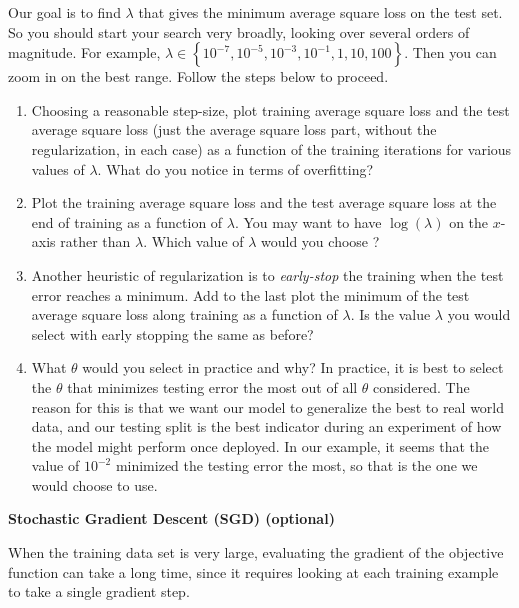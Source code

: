 \documentclass{article}
\newcommand{\nyuparagrah}[1]{\textcolor{nyupurple}{\large #1}}
\begin{document}
Our goal is to find $\lambda$
that gives the minimum average square loss on the test set. So you should start your search very broadly, looking
over several orders of magnitude. For example, $\lambda\in\left\{ 10^{-7},10^{-5},10^{-3},10^{-1},1,10,100\right\} $.
Then you can zoom in on the best range. Follow the steps below to proceed.
\begin{enumerate}
\setcounter{enumi}{\value{saveenum}}
\item 
Choosing a reasonable step-size, plot training average square loss and
the test average square loss (just the average square loss part, without the regularization, in each case) as a function of the training iterations for various values of $\lambda$. What do you notice in terms of overfitting?


\item Plot the training average square loss and
the test average square loss at the end of training as a function of $\lambda$. You may
want to have $\log(\lambda)$ on the $x$-axis rather than $\lambda$.
Which value of $\lambda$ would you choose ?  

\item Another heuristic of regularization is to \emph{early-stop} the training when the test error reaches a minimum. Add to the last plot the minimum of the test average square loss along training as a function of $\lambda$.
Is the value $\lambda$ you would select with early stopping the same as before? 


\item What $\theta$ would you select in practice and why?
\subitem
In practice, it is best to select the $\theta$ that minimizes testing error the most out of all $\theta$ considered. The reason for this is that we want our model to generalize the best to real world data, and our testing split is the best indicator during an experiment of how the model might perform once deployed. In our example, it seems that the value of $10^{-2}$ minimized the testing error the most, so that is the one we would choose to use. 
\setcounter{saveenum}{\value{enumi}}
\end{enumerate}

\newpage

\vspace{0.3cm}
\nyuparagrah{\bf Stochastic Gradient Descent (SGD) (optional)}

When the training data set is very large, evaluating the
gradient of the objective function can take a long time, since it
requires looking at each training example to take a single gradient
step. 
\end{document}
